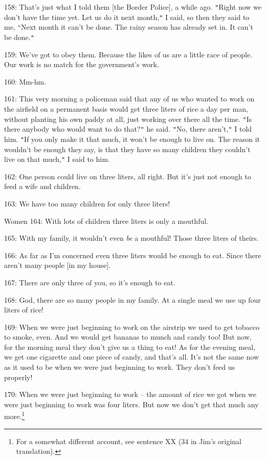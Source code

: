 158: That's just what I told them [the Border Police], a while ago. \texttt{"}Right
now we don't have the time yet. Let us do it next month,\texttt{"} I said, so then
they said to me, ``Next month it can't be done. The rainy season has already set
in. It can't be done.\texttt{"}

159: We've got to obey them. Because the likes of us are a little race of people.
Our work is no match for the government's work.

160: Mm-hm.

161: This very morning a policeman said that any of us who wanted to work on the
airfield on a permanent basis would get three liters of rice a day per man, without
planting his own paddy at all, just working over there all the time. \texttt{"}Is
there anybody who would want to do that?\texttt{"} he said. \texttt{"}No, there
aren't,\texttt{"} I told him. \texttt{"}If you only make it that much, it won't
be enough to live on. The reason it wouldn't be enough they say, is that they have
so many children they couldn't live on that much,\texttt{"} I said to him.

162: One person could live on three liters, all right. But it's just not enough
to feed a wife and children.

163: We have too many children for only three liters!

Women 164: With lots of children three liters is only a mouthful.

165: With my family, it wouldn't even \textit{be} a mouthful! Those three liters
of theirs.

166: As far as I'm concerned even three liters would be enough to eat. Since there
aren't many people [in my house].

167: There are only three of you, so it's enough to eat.

168: God, there are so many people in my family. At a single meal we use up four
liters of rice!

169: When we were just beginning to work on the airstrip we used to get tobacco
to smoke, even. And we would get bananas to munch and candy too! But now, for the
morning meal they don't give us a thing to eat! As for the evening meal, we get
one cigarette and one piece of candy, and that's all. It's not the same now as
it used to be when we were just beginning to work. They don't feed us properly!

170: When we were just beginning to work -- the amount of rice we got when we were
just beginning to work was four liters. But now we don't get that much any more.\footnote{For a somewhat different account, see sentence XX (34 in Jim's original translation).}

